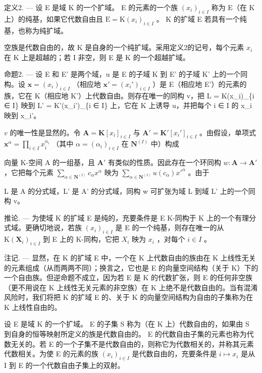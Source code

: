 定义2. --- 设 E 是域 K 的一个扩域。 E 的元素的一个族 \((x_{i})_{i\in I}\) 称为 E（在 K 上）的纯基，如果它代数自由且 \(\mathrm{E}=\mathrm{K}(x_{i})_{i\in I}\) 。 K 的扩域 E 若具有一个纯基，也称为纯扩域。

空族是代数自由的，故 K 是自身的一个纯扩域。采用定义2的记号，每个元素 \(x_{i}\) 在 K 上是超越的；若 I 非空，则 E 是 K 的一个超越扩域。

命题2. --- 设 E 和 E' 是两个域，u 是 E 的子域 K 到 E' 的子域 K' 上的一个同构。设 \(\mathbf{x} = (x_i)_{i \in I}\) （相应地 \(\mathbf{x}' = (x_i')_{i \in I}\) ）是 E（相应地 E'）的元素的族，它在 K（相应地 K'）上代数自由。则存在唯一的同构 v，把 L = K(x\_i)\_\{i ∈ I\} 映到 L' = K'(x\_i')\_\{i ∈ I\} 上，它在 K 上诱导 u，并把每个 i ∈ I 的 x\_i 映到 x\_i'。

\(v\) 的唯一性是显然的。令 \(\mathbf{A} = \mathbf{K}[x_i]_{i \in I}\) 与 \(\mathbf{A}' = \mathbf{K}'[x_i']_{i \in I}\) 。由假设，单项式 \(\mathbf{x}^\alpha = \prod_{i \in I} x_i^{\alpha_i}\) （其中 \(\alpha = (\alpha_i)_{i \in I}\) 在 \(\mathbf{N}^{(I)}\) 中）构成

向量 K-空间 A 的一组基，且 \(\mathbf{A}'\) 有类似的性质。因此存在一个环同构 \(w: \mathbf{A} \to \mathbf{A}'\) ，它把每个元素 \(\sum_{\alpha \in \mathbf{N}^{(I)}} c_{\alpha} x^{\alpha}\) 映为 \(\sum_{\alpha \in \mathbf{N}^{(I)}} u(c_{\alpha}) x'^{\alpha}\) 。由于

L 是 A 的分式域，L' 是 A' 的分式域，同构 w 可扩张为域 L 到域 L' 上的一个同构 v。

推论. --- 为使域 K 的扩域 E 是纯的，充要条件是 E K-同构于 K 上的一个有理分式域。更确切地说，若族 \((x_{i})_{i\in I}\) 是 E 的一个纯基，则存在唯一的从 \(\mathrm{K}(\mathbf{X}_{i})_{i\in I}\) 到 E 上的 K-同构，它把 \(X_{i}\) 映为 \(x_{i}\) ，对每个 \(i\in I\) 。

注记. --- 显然，在 K 的扩域 E 中，一个在 K 上代数自由的族由在 K 上线性无关的元素组成（从而两两不同）；换言之，它也是 E 的向量空间结构（关于 K）下的一个自由族。但逆命题不成立，因为若 E 是 K 的代数扩张，则 E 的任何非空族（更不用说在 K 上线性无关元素的非空族）在 K 上绝不是代数自由的。当有混淆风险时，我们将把 K 的扩域 E 的、关于 K 的向量空间结构为自由的子集称为在 K 上线性自由的。

设 E 是域 K 的一个扩域。 E 的子集 S 称为（在 K 上）代数自由的，如果由 S 到自身的恒等映射所定义的族是代数自由的。 E 的代数自由子集的元素也称为代数无关的。若 E 的一个子集不是代数自由的，则称它为代数相关的，并称其元素代数相关。为使 E 的元素的族 \((x_{i})_{i\in I}\) 是代数自由的，充要条件是 \(i\mapsto x_{i}\) 是从 I 到 E 的一个代数自由子集上的双射。


